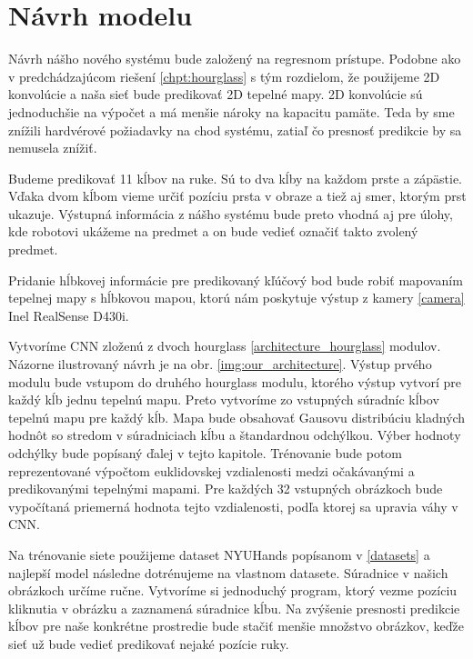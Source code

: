 \section{Návrh modelu}\label{sec:proposal}
Návrh nášho nového systému bude založený na regresnom prístupe. Podobne ako v predchádzajúcom riešení \ref{chpt:hourglass} s tým rozdielom, že použijeme 2D konvolúcie a naša sieť bude predikovať 2D tepelné mapy. 2D konvolúcie sú jednoduchšie na výpočet a má menšie nároky na kapacitu pamäte. Teda by sme znížili hardvérové požiadavky na chod systému, zatiaľ čo presnosť predikcie by sa nemusela znížiť.

Budeme predikovať 11 kĺbov na ruke. Sú to dva kĺby na každom prste a zápästie. Vďaka dvom kĺbom vieme určiť pozíciu prsta v obraze a tiež aj smer, ktorým prst ukazuje. Výstupná informácia z nášho systému bude preto vhodná aj pre úlohy, kde robotovi ukážeme na predmet a on bude vedieť označiť takto zvolený predmet.

Pridanie hĺbkovej informácie pre predikovaný kľúčový bod bude robiť mapovaním tepelnej mapy s hĺbkovou mapou, ktorú nám poskytuje výstup z kamery \ref{camera} Inel RealSense D430i. %

Vytvoríme CNN zloženú z dvoch hourglass \ref{architecture_hourglass} modulov. Názorne ilustrovaný návrh je na obr. \ref{img:our_architecture}. Výstup prvého modulu bude vstupom do druhého hourglass modulu, ktorého výstup vytvorí pre každý kĺb jednu tepelnú mapu. Preto vytvoríme zo vstupných súradníc kĺbov tepelnú mapu pre každý kĺb. Mapa bude obsahovať Gausovu distribúciu kladných hodnôt so stredom v súradniciach kĺbu a štandardnou odchýlkou. Výber hodnoty odchýlky bude popísaný ďalej v tejto kapitole. Trénovanie bude potom reprezentované výpočtom euklidovskej vzdialenosti medzi očakávanými a predikovanými tepelnými mapami. Pre každých 32 vstupných obrázkoch bude vypočítaná priemerná hodnota tejto vzdialenosti, podľa ktorej sa upravia váhy v CNN.

Na trénovanie siete použijeme dataset NYUHands popísanom v \ref{datasets} a najlepší model následne dotrénujeme na vlastnom datasete. Súradnice v našich obrázkoch určíme ručne. Vytvoríme si jednoduchý program, ktorý vezme pozíciu kliknutia v obrázku a zaznamená súradnice kĺbu. Na zvýšenie presnosti predikcie kĺbov pre naše konkrétne prostredie bude stačiť menšie množstvo obrázkov, keďže sieť už bude vedieť predikovať nejaké pozície ruky.